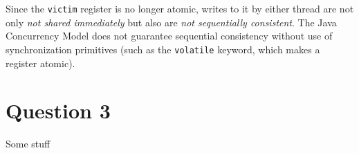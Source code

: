\documentclass[11pt, letterpaper]{article}
\newcommand{\code}[1] { \texttt{#1} }
\begin{document}
Since the \code{victim} register is no longer atomic, writes to it by either thread are not only \textit{not shared immediately} but also are \textit{not sequentially consistent}. The Java Concurrency Model does not guarantee sequential consistency without use of synchronization primitives (such as the \code{volatile} keyword, which makes a register atomic).

\newpage
\section*{Question 3}
\label{sec:question_3}

Some stuff
\end{document}
